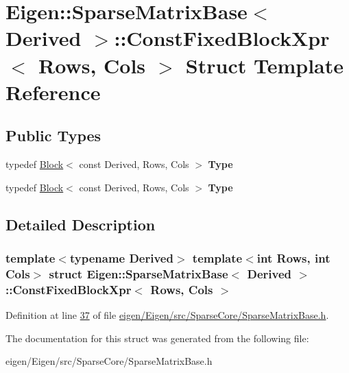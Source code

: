 \hypertarget{struct_eigen_1_1_sparse_matrix_base_1_1_const_fixed_block_xpr}{}\section{Eigen\+:\+:Sparse\+Matrix\+Base$<$ Derived $>$\+:\+:Const\+Fixed\+Block\+Xpr$<$ Rows, Cols $>$ Struct Template Reference}
\label{struct_eigen_1_1_sparse_matrix_base_1_1_const_fixed_block_xpr}
\subsection*{Public Types}
\begin{DoxyCompactItemize}
\item 
\mbox{\label{struct_eigen_1_1_sparse_matrix_base_1_1_const_fixed_block_xpr_afdc6cb19cc884653a1eb1a1d2aafe551}} 
typedef \hyperlink{group___core___module_class_eigen_1_1_block}{Block}$<$ const Derived, Rows, Cols $>$ {\bfseries Type}
\item 
\mbox{\label{struct_eigen_1_1_sparse_matrix_base_1_1_const_fixed_block_xpr_afdc6cb19cc884653a1eb1a1d2aafe551}} 
typedef \hyperlink{group___core___module_class_eigen_1_1_block}{Block}$<$ const Derived, Rows, Cols $>$ {\bfseries Type}
\end{DoxyCompactItemize}


\subsection{Detailed Description}
\subsubsection*{template$<$typename Derived$>$\newline
template$<$int Rows, int Cols$>$\newline
struct Eigen\+::\+Sparse\+Matrix\+Base$<$ Derived $>$\+::\+Const\+Fixed\+Block\+Xpr$<$ Rows, Cols $>$}



Definition at line \hyperlink{eigen_2_eigen_2src_2_sparse_core_2_sparse_matrix_base_8h_source_l00037}{37} of file \hyperlink{eigen_2_eigen_2src_2_sparse_core_2_sparse_matrix_base_8h_source}{eigen/\+Eigen/src/\+Sparse\+Core/\+Sparse\+Matrix\+Base.\+h}.



The documentation for this struct was generated from the following file\+:\begin{DoxyCompactItemize}
\item 
eigen/\+Eigen/src/\+Sparse\+Core/\+Sparse\+Matrix\+Base.\+h\end{DoxyCompactItemize}
